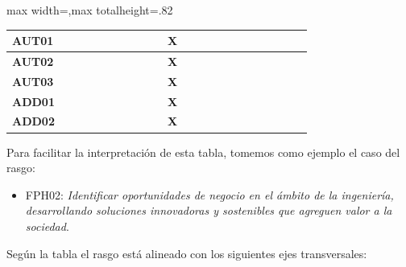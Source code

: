 \begin{center}
\begin{adjustbox}{max width=\textwidth,max totalheight=.82\textheight}
\begin{tabular}{|l|c|c|c|c|c|c|c|c|c|c|c|c|c|c|c|c|c|c|c|c|c|}
\rowcolor{azulClaro}
\textcolor{azulTEC}{\textbf{AUT01}} & \textbf{ } & \textbf{ } & \textbf{ } & \textbf{ } & \textbf{ } & \textbf{ } & \textbf{ } & \textbf{ } & \textbf{ } & \textbf{X} & \textbf{ } & \textbf{ } & \textbf{ } & \textbf{ } & \textbf{ } & \textbf{ } & \textbf{ } & \textbf{ } & \textbf{ } & \textbf{ } & \textbf{ } \\ \hline
\rowcolor{azulClaro}
\textcolor{azulTEC}{\textbf{AUT02}} & \textbf{ } & \textbf{ } & \textbf{ } & \textbf{ } & \textbf{ } & \textbf{ } & \textbf{ } & \textbf{ } & \textbf{ } & \textbf{X} & \textbf{ } & \textbf{ } & \textbf{ } & \textbf{ } & \textbf{ } & \textbf{ } & \textbf{ } & \textbf{ } & \textbf{ } & \textbf{ } & \textbf{ } \\ \hline
\rowcolor{azulClaro}
\textcolor{azulTEC}{\textbf{AUT03}} & \textbf{ } & \textbf{ } & \textbf{ } & \textbf{ } & \textbf{ } & \textbf{ } & \textbf{ } & \textbf{ } & \textbf{ } & \textbf{X} & \textbf{ } & \textbf{ } & \textbf{ } & \textbf{ } & \textbf{ } & \textbf{ } & \textbf{ } & \textbf{ } & \textbf{ } & \textbf{ } & \textbf{ } \\ \hline
\rowcolor{azulClaro}
\textcolor{azulTEC}{\textbf{ADD01}} & \textbf{ } & \textbf{ } & \textbf{ } & \textbf{ } & \textbf{ } & \textbf{ } & \textbf{ } & \textbf{ } & \textbf{ } & \textbf{X} & \textbf{ } & \textbf{ } & \textbf{ } & \textbf{ } & \textbf{ } & \textbf{ } & \textbf{ } & \textbf{ } & \textbf{ } & \textbf{ } & \textbf{ } \\ \hline
\rowcolor{azulClaro}
\textcolor{azulTEC}{\textbf{ADD02}} & \textbf{ } & \textbf{ } & \textbf{ } & \textbf{ } & \textbf{ } & \textbf{ } & \textbf{ } & \textbf{ } & \textbf{ } & \textbf{X} & \textbf{ } & \textbf{ } & \textbf{ } & \textbf{ } & \textbf{ } & \textbf{ } & \textbf{ } & \textbf{ } & \textbf{ } & \textbf{ } & \textbf{ } \\ \hline
\end{tabular}
\end{adjustbox}
\end{center}

Para facilitar la interpretación de esta tabla, tomemos como ejemplo el caso del rasgo:\par

\begin{itemize}
\item FPH02: \textit{Identificar oportunidades de negocio en el ámbito de la ingeniería, desarrollando soluciones innovadoras y sostenibles que agreguen valor a la sociedad}.
\end{itemize}
Según la tabla el rasgo está alineado con los siguientes ejes transversales:\par

